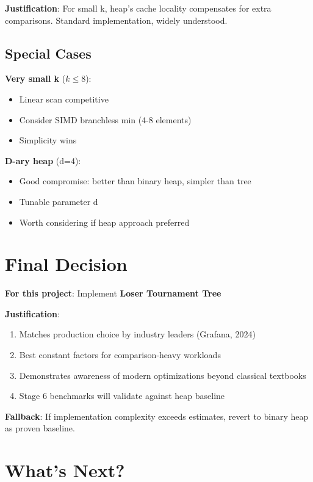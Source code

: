 \documentclass[11pt]{article}
\begin{document}
\textbf{Justification}: For small k, heap's cache locality compensates for extra comparisons. Standard implementation, widely understood.

\subsection{Special Cases}

\textbf{Very small k} ($k \leq 8$):
\begin{itemize}
    \item Linear scan competitive
    \item Consider SIMD branchless min (4-8 elements)
    \item Simplicity wins
\end{itemize}

\textbf{D-ary heap} (d=4):
\begin{itemize}
    \item Good compromise: better than binary heap, simpler than tree
    \item Tunable parameter d
    \item Worth considering if heap approach preferred
\end{itemize}

\section{Final Decision}

\textbf{For this project}: Implement \textbf{Loser Tournament Tree}

\textbf{Justification}:
\begin{enumerate}
    \item Matches production choice by industry leaders (Grafana, 2024)
    \item Best constant factors for comparison-heavy workloads
    \item Demonstrates awareness of modern optimizations beyond classical textbooks
    \item Stage 6 benchmarks will validate against heap baseline
\end{enumerate}

\textbf{Fallback}: If implementation complexity exceeds estimates, revert to binary heap as proven baseline.

\section{What's Next?}
\end{document}
